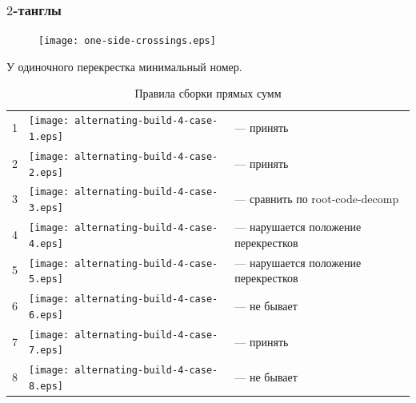 \documentclass[dvips, intlimits, 9pt, unicode, notheorems]{beamer}
\theoremstyle{plain}
\theoremstyle{definition}
\begin{document}
	\begin{frame}
		\frametitle{$2$-танглы}

		\begin{figure}[ht]
			\centering
			\texttt{[image: one-side-crossings.eps]}
		\end{figure}

		
		\begin{center}
			У одиночного перекрестка минимальный номер.
		\end{center}

		\begin{table}[ht]
			\caption{Правила сборки прямых сумм\label{table:sums-rules}}
			\centering
			\begin{tabular}{cm{22mm}l}
				\hline
				1 & \texttt{[image: alternating-build-4-case-1.eps]} & --- принять \\
				2 & \texttt{[image: alternating-build-4-case-2.eps]} & --- принять \\
				3 & \texttt{[image: alternating-build-4-case-3.eps]} & --- сравнить по root-code-decomp \\
				4 & \texttt{[image: alternating-build-4-case-4.eps]} & --- нарушается положение перекрестков \\
				5 & \texttt{[image: alternating-build-4-case-5.eps]} & --- нарушается положение перекрестков \\
				6 & \texttt{[image: alternating-build-4-case-6.eps]} & --- не бывает \\
				7 & \texttt{[image: alternating-build-4-case-7.eps]} & --- принять \\
				8 & \texttt{[image: alternating-build-4-case-8.eps]} & --- не бывает \\
				\hline
			\end{tabular}
		\end{table}

	\end{frame}
\end{document}
